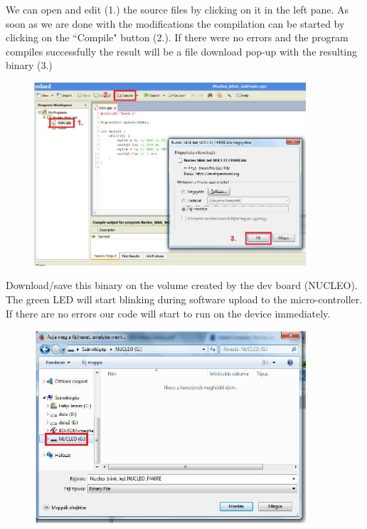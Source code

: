 \documentclass[a4paper]{article}
\begin{document}
We can open and edit (1.) the source files by clicking on it in the left pane. As soon as we are done with the
modifications the compilation can be started by clicking on the ``Compile" button (2.). If there were no errors and the
program compiles successfully the result will be a file download pop-up with the resulting binary (3.)

\begin{figure}[H]
    \centering
    \includegraphics[width=0.9\textwidth]{figures/mbed-compile.png}
\end{figure}

Download/save this binary on the volume created by the dev board (NUCLEO). The green LED will start blinking during
software upload to the micro-controller. If there are no errors our code will start to run on the device immediately.

\begin{figure}[H]
    \centering
    \includegraphics[width=0.9\textwidth]{figures/mbed-nucleo-save.png}
\end{figure}
\end{document}
